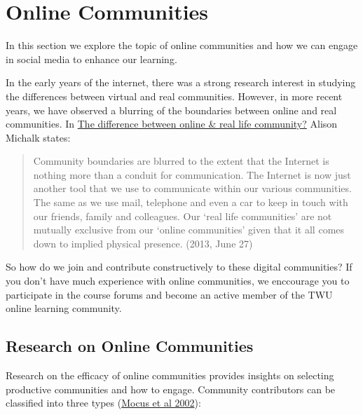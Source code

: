 \documentclass[
]{book}
\theoremstyle{definition}
\theoremstyle{definition}
\theoremstyle{definition}
\theoremstyle{definition}
\theoremstyle{remark}
\begin{document}
\hypertarget{online-communities}{%
\section{Online Communities}\label{online-communities}}

In this section we explore the topic of online communities and how we can engage in social media to enhance our learning.

In the early years of the internet, there was a strong research interest in studying the differences between virtual and real communities. However, in more recent years, we have observed a blurring of the boundaries between online and real communities. In \href{https://quiip.com.au/is-there-a-definitive-difference-between-online-and-real-life-community/}{The difference between online \& real life community?} Alison Michalk states:

\begin{quote}
Community boundaries are blurred to the extent that the Internet is nothing more than a conduit for communication. The Internet is now just another tool that we use to communicate within our various communities. The same as we use mail, telephone and even a car to keep in touch with our friends, family and colleagues. Our `real life communities' are not mutually exclusive from our `online communities' given that it all comes down to implied physical presence. (2013, June 27)
\end{quote}

So how do we join and contribute constructively to these digital communities? If you don't have much experience with online communities, we enccourage you to participate in the course forums and become an active member of the TWU online learning community.

\hypertarget{research-on-online-communities}{%
\subsection*{Research on Online Communities}\label{research-on-online-communities}}

Research on the efficacy of online communities provides insights on selecting productive communities and how to engage. Community contributors can be classified into three types (\href{https://twu.idm.oclc.org/login?url=https://search.ebscohost.com/login.aspx?direct=true\&db=edb\&AN=100369742\&site=eds-live\&scope=site}{Mocus et al 2002}):
\end{document}
